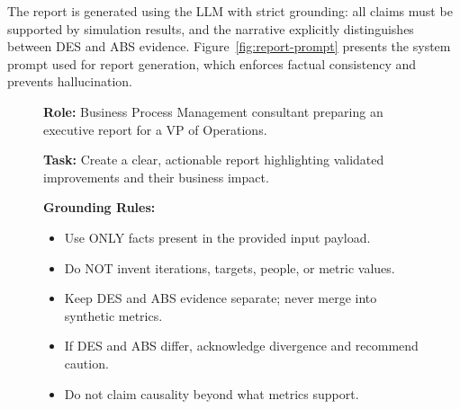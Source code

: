 \documentclass[preprint,12pt]{elsarticle}
\begin{document}
The report is generated using the LLM with strict grounding: all claims must be supported by simulation results, and the narrative explicitly distinguishes between DES and ABS evidence. Figure~\ref{fig:report-prompt} presents the system prompt used for report generation, which enforces factual consistency and prevents hallucination.

\begin{figure}[!t]
\begin{tcolorbox}[
    title=System Prompt: Report Generation,
    colframe=black!80,
    fonttitle=\bfseries,
    boxsep=2pt, left=5pt, right=5pt, top=1mm, bottom=1mm,
    toptitle=0.5mm, bottomtitle=0.5mm
]
    \footnotesize
    \begin{tcolorbox}[colback=rolecolor, colframe=white, boxrule=0pt,
        size=fbox, arc=0mm,
        before skip=0pt, after skip=1pt]
        \textbf{Role:} Business Process Management consultant preparing an executive report for a VP of Operations.
    \end{tcolorbox}

    \begin{tcolorbox}[colback=goalcolor, colframe=white, boxrule=0pt,
        size=fbox, arc=0mm,
        before skip=0pt, after skip=1pt]
        \textbf{Task:} Create a clear, actionable report highlighting validated improvements and their business impact.
    \end{tcolorbox}

    \begin{tcolorbox}[colback=rulecolor, colframe=white, boxrule=0pt,
        size=fbox, arc=0mm,
        before skip=0pt, after skip=1pt]
        \textbf{Grounding Rules:}
        \begin{itemize}[nosep, leftmargin=*, labelsep=1.5pt]
            \item Use ONLY facts present in the provided input payload.
            \item Do NOT invent iterations, targets, people, or metric values.
            \item Keep DES and ABS evidence separate; never merge into synthetic metrics.
            \item If DES and ABS differ, acknowledge divergence and recommend caution.
            \item Do not claim causality beyond what metrics support.
        \end{itemize}
    \end{tcolorbox}


\end{tcolorbox}
\end{figure}
\end{document}
